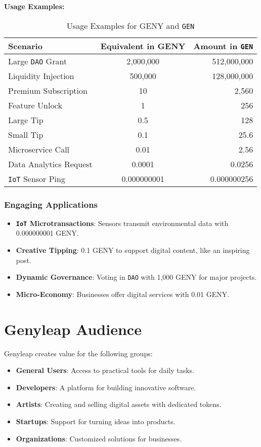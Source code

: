\documentclass[a4paper,12pt,openany]{book}
\begin{document}
\textbf{Usage Examples:}
\begin{table}[h]
\centering
\caption{Usage Examples for GENY and \texttt{GEN}}
\small
\begin{tabular}{l c r}
\hline
\textbf{Scenario} & \textbf{Equivalent in GENY} & \textbf{Amount in \texttt{GEN}} \\
\hline
Large \texttt{DAO} Grant & 2,000,000 & 512,000,000 \\
Liquidity Injection & 500,000 & 128,000,000 \\
Premium Subscription & 10 & 2,560 \\
Feature Unlock & 1 & 256 \\
Large Tip & 0.5 & 128 \\
Small Tip & 0.1 & 25.6 \\
Microservice Call & 0.01 & 2.56 \\
Data Analytics Request & 0.0001 & 0.0256 \\
\texttt{IoT} Sensor Ping & 0.000000001 & 0.000000256 \\
\hline
\end{tabular}
\end{table}

\subsection*{Engaging Applications}
\begin{itemize}
    \item \textbf{\texttt{IoT} Microtransactions}: Sensors transmit environmental data with 0.000000001 GENY.
    \item \textbf{Creative Tipping}: 0.1 GENY to support digital content, like an inspiring post.
    \item \textbf{Dynamic Governance}: Voting in \texttt{DAO} with 1,000 GENY for major projects.
    \item \textbf{Micro-Economy}: Businesses offer digital services with 0.01 GENY.
\end{itemize}

\chapter{Genyleap Audience}
Genyleap creates value for the following groups:
\begin{itemize}
    \item \textbf{General Users}: Access to practical tools for daily tasks.
    \item \textbf{Developers}: A platform for building innovative software.
    \item \textbf{Artists}: Creating and selling digital assets with dedicated tokens.
    \item \textbf{Startups}: Support for turning ideas into products.
    \item \textbf{Organizations}: Customized solutions for businesses.
\end{itemize}
\end{document}
